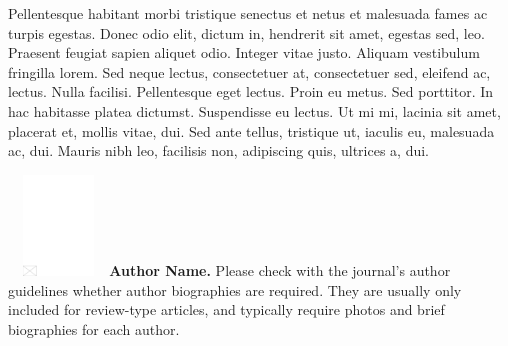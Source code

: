 \documentclass[APA,Times1COL]{WileyNJDv5} %
\begin{document}
Pellentesque habitant morbi tristique senectus et netus et malesuada fames ac turpis egestas. Donec odio elit,
dictum in, hendrerit sit amet, egestas sed, leo. Praesent feugiat sapien aliquet odio. Integer vitae justo. Aliquam
vestibulum fringilla lorem. Sed neque lectus, consectetuer at, consectetuer sed, eleifend ac, lectus. Nulla facilisi.
Pellentesque eget lectus. Proin eu metus. Sed porttitor. In hac habitasse platea dictumst. Suspendisse eu lectus. Ut
mi mi, lacinia sit amet, placerat et, mollis vitae, dui. Sed ante tellus, tristique ut, iaculis eu, malesuada ac, dui.
Mauris nibh leo, facilisis non, adipiscing quis, ultrices a, dui.

\nocite{*}%



\begin{biography}{\includegraphics[width=76pt,height=76pt,draft]{empty}}{
{\textbf{Author Name.} Please check with the journal's author guidelines whether
author biographies are required. They are usually only included for
review-type articles, and typically require photos and brief
biographies for each author.}}
\end{biography}
\end{document}
